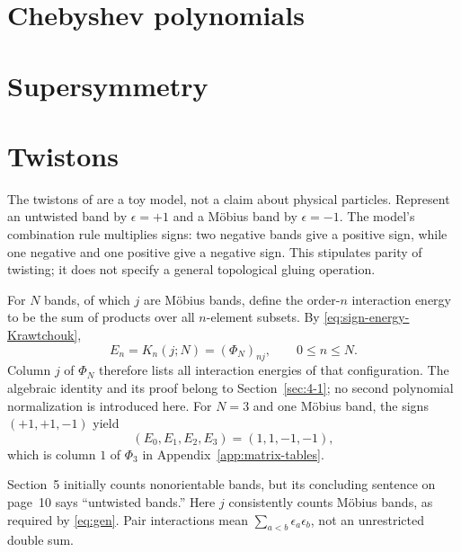 \section{Chebyshev polynomials}
\label{sec:9-4}

\section{Supersymmetry}
\label{sec:9-5}

\section{Twistons}
\label{sec:9-6}
The twistons of \cite[Section~5, pp.~9--10]{KocikFeynman} are a toy model,
not a claim about physical particles. Represent an untwisted band by
$\epsilon=+1$ and a M\"obius band by $\epsilon=-1$. The model's combination
rule multiplies signs: two negative bands give a positive sign, while one
negative and one positive give a negative sign. This stipulates parity of
twisting; it does not specify a general topological gluing operation.

For $N$ bands, of which $j$ are M\"obius bands, define the order-$n$
interaction energy to be the sum of products over all $n$-element subsets.
By \eqref{eq:sign-energy-Krawtchouk},
\[
E_n=K_n(j;N)=(\Phi_N)_{nj},\qquad 0\leq n\leq N.
\]
Column $j$ of $\Phi_N$ therefore lists all interaction energies of that
configuration. The algebraic identity and its proof belong to
Section~\ref{sec:4-1}; no second polynomial normalization is introduced here.
For $N=3$ and one M\"obius band, the signs $(+1,+1,-1)$ yield
\[
(E_0,E_1,E_2,E_3)=(1,1,-1,-1),
\]
which is column $1$ of $\Phi_3$ in Appendix~\ref{app:matrix-tables}.

\begin{remark}
Section~5 initially counts nonorientable bands, but its concluding
sentence on page~10 says ``untwisted bands.'' Here $j$ consistently counts
M\"obius bands, as required by \eqref{eq:gen}. Pair interactions mean
$\sum_{a<b}\epsilon_a\epsilon_b$, not an unrestricted double sum.
\end{remark}

